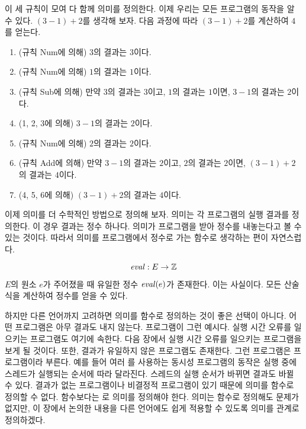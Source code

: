 

이 세 규칙이 모여 다 함께  의미를 정의한다. 이제 우리는 모든 \Lang
프로그램의 동작을 알 수 있다. $(3-1)+2$를 생각해 보자. 다음 과정에 따라
$(3-1)+2$를 계산하여 $4$를 얻는다.

\begin{enumerate}
  \item (규칙 Num에 의해) $3$의 결과는 $3$이다.
  \item (규칙 Num에 의해) $1$의 결과는 $1$이다.
  \item (규칙 Sub에 의해) 만약 $3$의 결과는 $3$이고, $1$의 결과는
    $1$이면, $3-1$의 결과는 $2$이다.
  \item (1, 2, 3에 의해) $3-1$의 결과는 $2$이다.
  \item (규칙 Num에 의해) $2$의 결과는 $2$이다.
  \item (규칙 Add에 의해) 만약 $3-1$의 결과는 $2$이고, $2$의 결과는 $2$이면,
    $(3-1)+2$의 결과는 $4$이다.
  \item (4, 5, 6에 의해) $(3-1)+2$의 결과는 $4$이다.
\end{enumerate}

이제  의미를 더 수학적인 방법으로 정의해 보자. 의미는 각 프로그램의 실행
결과를 정의한다. 이 경우 결과는 정수 하나다. 의미가 프로그램을 받아 정수를
내놓는다고 볼 수 있는 것이다. 따라서 의미를 프로그램에서 정수로 가는 함수로
생각하는 편이 자연스럽다.

\[\mbox{$\mathit{eval}$}:E\rightarrow \mathbb{Z}\]

$E$의 원소 $e$가 주어졌을 때 유일한 정수 $\mbox{$\mathit{eval}$}(e)$가 존재한다.
 이는 사실이다. 모든 산술식을 계산하여 정수를 얻을 수 있다.

하지만 다른 언어까지 고려하면 의미를 함수로 정의하는 것이 좋은 선택이 아니다.
어떤 프로그램은 아무 결과도 내지 않는다.  프로그램이 그런 예시다. 실행 시간 오류를 일으키는
프로그램도 여기에 속한다. 다음 장에서 실행 시간 오류를 일으키는 프로그램을 보게
될 것이다. 또한, 결과가 유일하지 않은 프로그램도 존재한다. 그런 프로그램은
 프로그램이라 부른다. 예를 들어 여러
를 사용하는 동시성 프로그램의 동작은 실행 중에 스레드가
실행되는 순서에 따라 달라진다. 스레드의 실행 순서가 바뀌면 결과도 바뀔 수 있다.
결과가 없는 프로그램이나 비결정적 프로그램이 있기 때문에 의미를 함수로 정의할 수
없다. 함수보다는 로 의미를 정의해야 한다.  의미는
함수로 정의해도 문제가 없지만, 이 장에서 논의한 내용을 다른 언어에도 쉽게 적용할
수 있도록 의미를 관계로 정의하겠다.

